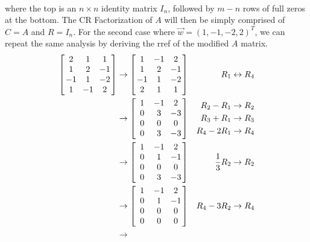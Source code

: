 \begin{solution}
\begin{align*}
\end{align*}
where the top is an $n \times n$ identity matrix $I_n$, followed by $m-n$ rows of full zeros at the bottom. The CR Factorization of $A$ will then be simply comprised of $C=A$ and $R=I_n$. For the second case where $\vec{w} = (1,-1,-2,2)^T$, we can repeat the same analysis by deriving the rref of the modified $A$ matrix.
\begin{align*}
\left[
\begin{array}{@{\;}wc{10pt}wc{10pt}wc{10pt}@{\;}}
2 & 1 & 1 \\
1 & 2 & -1 \\
-1 & 1 & -2 \\
1 & -1 & 2 
\end{array}
\right]
&\to
\left[
\begin{array}{@{\;}wc{10pt}wc{10pt}wc{10pt}@{\;}}
1 & -1 & 2 \\
1 & 2 & -1 \\
-1 & 1 & -2 \\
2 & 1 & 1 
\end{array}
\right] & R_1 \leftrightarrow R_4 \\
&\to
\left[
\begin{array}{@{\;}wc{10pt}wc{10pt}wc{10pt}@{\;}}
1 & -1 & 2 \\
0 & 3 & -3 \\
0 & 0 & 0 \\
0 & 3 & -3 
\end{array}
\right] & 
\begin{aligned}
R_2 - R_1 \to R_2 \\
R_3 + R_1 \to R_3 \\
R_4 - 2R_1 \to R_4
\end{aligned} \\
&\to
\left[
\begin{array}{@{\;}wc{10pt}wc{10pt}wc{10pt}@{\;}}
1 & -1 & 2 \\
0 & 1 & -1 \\
0 & 0 & 0 \\
0 & 3 & -3 
\end{array}
\right] & \frac{1}{3}R_2 \to R_2 \\
&\to
\left[
\begin{array}{@{\;}wc{10pt}wc{10pt}wc{10pt}@{\;}}
1 & -1 & 2 \\
0 & 1 & -1 \\
0 & 0 & 0 \\
0 & 0 & 0 
\end{array}
\right] & R_4 - 3R_2 \to R_4 \\
&\to

\end{align*}
\end{solution}
